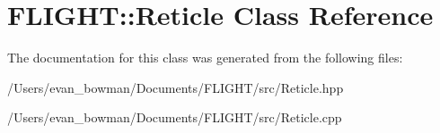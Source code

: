 \hypertarget{class_f_l_i_g_h_t_1_1_reticle}{}\section{F\+L\+I\+G\+HT\+:\+:Reticle Class Reference}
\label{class_f_l_i_g_h_t_1_1_reticle}


The documentation for this class was generated from the following files\+:\begin{DoxyCompactItemize}
\item 
/\+Users/evan\+\_\+bowman/\+Documents/\+F\+L\+I\+G\+H\+T/src/Reticle.\+hpp\item 
/\+Users/evan\+\_\+bowman/\+Documents/\+F\+L\+I\+G\+H\+T/src/Reticle.\+cpp\end{DoxyCompactItemize}
